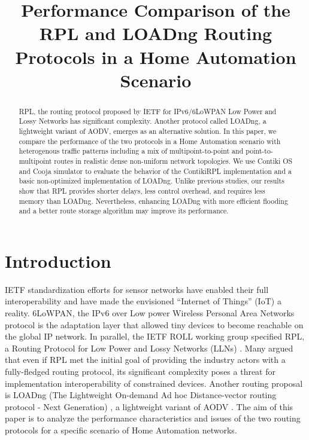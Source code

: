 \documentclass[conference,10pt,a4paper]{IEEEtran}
\author{\IEEEauthorblockN{Mali\v{s}a Vu\v{c}ini\'{c}, Bernard Tourancheau, and Andrzej Duda\\}
\IEEEauthorblockN{University of Grenoble, CNRS Grenoble Informatics Laboratory UMR 5217 LIG, Grenoble, France\\
Email: \{Malisa.Vucinic, Bernard.Tourancheau, Andrzej.Duda\}@imag.fr}}
\begin{document}
\title{Performance Comparison of the RPL and LOADng Routing Protocols in a Home
  Automation Scenario}


\maketitle



\begin{abstract} 

  RPL, the routing protocol proposed by IETF for IPv6/6LoWPAN Low Power and
  Lossy Networks has significant complexity. Another protocol called LOADng, a
  lightweight variant of AODV, emerges as an alternative solution. In this
  paper, we compare the performance of the two protocols in a Home Automation
  scenario with heterogenous traffic patterns including a mix of
  multipoint-to-point and point-to-multipoint routes in realistic dense
  non-uniform network topologies. 
  We use Contiki OS and Cooja simulator to evaluate the behavior of the
  ContikiRPL implementation and a basic non-optimized implementation of LOADng. 
  Unlike previous studies, our results show that RPL provides shorter delays,
  less control overhead, and requires less memory than LOADng. Nevertheless,
  enhancing LOADng with more efficient flooding and a better route storage
algorithm may improve its performance.
\end{abstract} 

\section{Introduction}
\label{introduction} 

IETF standardization efforts for sensor networks have enabled their full
interoperability and have made the envisioned ``Internet of Things'' (IoT) a
reality. 6LoWPAN, the IPv6 over Low power Wireless Personal Area Networks
protocol \cite{6lowpan-specs-rfc} is the adaptation layer that allowed tiny
devices to become reachable on the global IP network. 
In parallel, the IETF ROLL working group specified RPL, a Routing Protocol for
Low Power and Lossy Networks (LLNs) \cite{rpl-draft}. 
Many argued that even if RPL met the initial goal of providing the industry
actors with a fully-fledged routing protocol, its significant complexity poses a
threat for implementation interoperability of constrained devices. 
Another routing proposal is LOADng (The Lightweight On-demand Ad hoc Distance-vector routing
protocol - Next Generation) \cite{loadng-draft}, a lightweight variant of AODV
\cite{aodv-rfc}.
The aim of this paper is to analyze the performance characteristics and issues of
the two routing protocols for a specific scenario of Home Automation networks.
\end{document}
